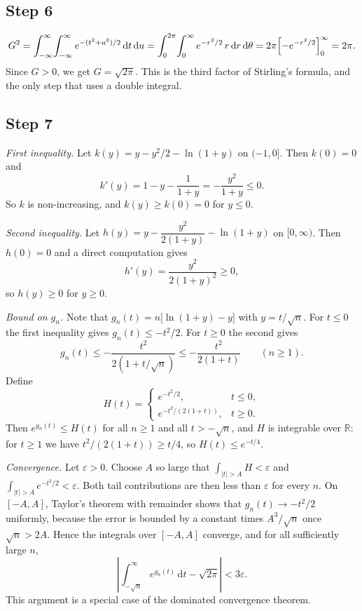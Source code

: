 \documentclass{workbook}
\theoremstyle{step}
\newcommand{\dd}{\,\mathrm{d}}
\begin{document}
\subsection*{Step 6}

\[
  G^2 = \int_{-\infty}^{\infty}\!\int_{-\infty}^{\infty}
        e^{-(t^2+u^2)/2}\dd t\dd u
      = \int_0^{2\pi}\!\int_0^{\infty} e^{-r^2/2}\, r\dd r\dd\theta
      = 2\pi \Bigl[-e^{-r^2/2}\Bigr]_0^{\infty}
      = 2\pi .
\]
Since $G > 0$, we get $G = \sqrt{2\pi}$. This is the third factor of
Stirling's formula, and the only step that uses a double integral.

\subsection*{Step 7}

\emph{First inequality.} Let $k(y) = y - y^2/2 - \ln(1+y)$ on $(-1, 0]$. Then
$k(0) = 0$ and
\[
  k'(y) = 1 - y - \frac{1}{1+y} = -\frac{y^2}{1+y} \le 0 .
\]
So $k$ is non-increasing, and $k(y) \ge k(0) = 0$ for $y \le 0$.

\emph{Second inequality.} Let
$h(y) = y - \dfrac{y^2}{2(1+y)} - \ln(1+y)$ on $[0,\infty)$. Then $h(0) = 0$
and a direct computation gives
\[
  h'(y) = \frac{y^2}{2(1+y)^2} \ge 0 ,
\]
so $h(y) \ge 0$ for $y \ge 0$.

\emph{Bound on $g_n$.} Note that
$g_n(t) = n\bigl[\ln(1+y) - y\bigr]$ with $y = t/\sqrt{n}$. For $t\le 0$ the
first inequality gives $g_n(t) \le -t^2/2$. For $t \ge 0$ the second gives
\[
  g_n(t) \le -\frac{t^2}{2(1 + t/\sqrt{n})} \le -\frac{t^2}{2(1+t)}
  \qquad (n \ge 1).
\]
Define
\[
  H(t) =
  \begin{cases}
    e^{-t^2/2}, & t \le 0,\\[0.3em]
    e^{-t^2/(2(1+t))}, & t \ge 0.
  \end{cases}
\]
Then $e^{g_n(t)} \le H(t)$ for all $n\ge 1$ and all $t > -\sqrt{n}$, and $H$
is integrable over $\mathbb{R}$: for $t \ge 1$ we have
$t^2/(2(1+t)) \ge t/4$, so $H(t) \le e^{-t/4}$.

\emph{Convergence.} Let $\varepsilon > 0$. Choose $A$ so large that
$\int_{|t|>A} H < \varepsilon$ and $\int_{|t|>A} e^{-t^2/2} < \varepsilon$.
Both tail contributions are then less than $\varepsilon$ for every $n$. On
$[-A, A]$, Taylor's theorem with remainder shows that
$g_n(t) \to -t^2/2$ uniformly, because the error is bounded by a constant
times $A^3/\sqrt{n}$ once $\sqrt{n} > 2A$. Hence the integrals over
$[-A, A]$ converge, and for all sufficiently large $n$,
\[
  \left| \int_{-\sqrt{n}}^{\infty} e^{g_n(t)}\dd t - \sqrt{2\pi}\right|
  < 3\varepsilon .
\]
This argument is a special case of the dominated convergence theorem.
\end{document}
